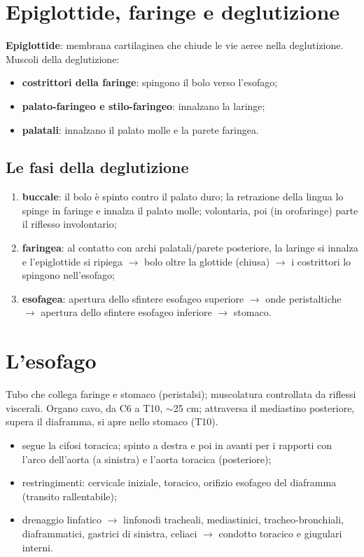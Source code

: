 \section{Epiglottide, faringe e deglutizione}

\textbf{Epiglottide}: membrana cartilaginea che chiude le vie aeree nella deglutizione. Muscoli della
deglutizione:
\begin{itemize}
  \item \textbf{costrittori della faringe}: spingono il bolo verso l'esofago;
  \item \textbf{palato-faringeo e stilo-faringeo}: innalzano la laringe;
  \item \textbf{palatali}: innalzano il palato molle e la parete faringea.
\end{itemize}

\subsection{Le fasi della deglutizione}
\begin{enumerate}
  \item \textbf{buccale}: il bolo è spinto contro il palato duro; la retrazione della lingua lo spinge
    in faringe e innalza il palato molle; volontaria, poi (in orofaringe) parte il riflesso
    involontario;
  \item \textbf{faringea}: al contatto con archi palatali/parete posteriore, la laringe si innalza e
    l'epiglottide si ripiega $\rightarrow$ bolo oltre la glottide (chiusa) $\rightarrow$ i costrittori
    lo spingono nell'esofago;
  \item \textbf{esofagea}: apertura dello sfintere esofageo superiore $\rightarrow$ onde peristaltiche
    $\rightarrow$ apertura dello sfintere esofageo inferiore $\rightarrow$ stomaco.
\end{enumerate}

\section{L'esofago}

Tubo che collega faringe e stomaco (peristalsi); muscolatura controllata da riflessi viscerali. Organo
cavo, da C6 a T10, $\sim$25 cm; attraversa il mediastino posteriore, supera il diaframma, si apre nello
stomaco (T10).
\begin{itemize}
  \item segue la cifosi toracica; spinto a destra e poi in avanti per i rapporti con l'arco dell'aorta
    (a sinistra) e l'aorta toracica (posteriore);
  \item restringimenti: cervicale iniziale, toracico, orifizio esofageo del diaframma (transito
    rallentabile);
  \item drenaggio linfatico $\rightarrow$ linfonodi tracheali, mediastinici, tracheo-bronchiali,
    diaframmatici, gastrici di sinistra, celiaci $\rightarrow$ condotto toracico e giugulari interni.
\end{itemize}

